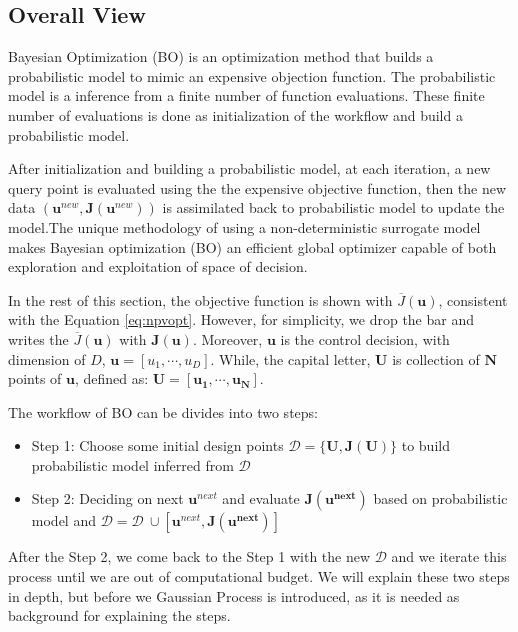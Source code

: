 \documentclass[]{elsarticle} %
\providecommand{\tightlist}{%
  \setlength{\itemsep}{0pt}\setlength{\parskip}{0pt}}
\begin{document}
\hypertarget{overall-view}{%
\subsection{Overall View}\label{overall-view}}

Bayesian Optimization (BO) is an optimization method that builds a probabilistic model to mimic an expensive objection function. The probabilistic model is a inference from a finite number of function evaluations. These finite number of evaluations is done as initialization of the workflow and build a probabilistic model.

After initialization and building a probabilistic model, at each iteration, a new query point is evaluated using the the expensive objective function, then the new data \((\mathbf{u}^{new},\mathbf{J}(\mathbf{u}^{new}))\) is assimilated back to probabilistic model to update the model.The unique methodology of using a non-deterministic surrogate model makes Bayesian optimization (BO) an efficient global optimizer capable of both exploration and exploitation of space of decision.

In the rest of this section, the objective function is shown with \(\overline{J}(\mathbf{u})\), consistent with the Equation \eqref{eq:npvopt}. However, for simplicity, we drop the bar and writes the \(\overline{J}(\mathbf{u})\) with \(\mathbf{J}(\mathbf{u})\). Moreover, \(\mathbf{u}\) is the control decision, with dimension of \(D\), \(\mathbf{u}=[u_1,\cdots,u_D]\). While, the capital letter, \(\mathbf{U}\) is collection of \(\mathbf{N}\) points of \(\mathbf{u}\), defined as: \(\mathbf{U}= [\mathbf{u_1},\cdots,\mathbf{u_N}]\).

The workflow of BO can be divides into two steps:

\begin{itemize}
\tightlist
\item
  Step 1: Choose some initial design points \(\mathcal{D}=\{{\mathbf{U},\mathbf{J(U)}}\}\) to build probabilistic model inferred from \(\mathcal{D}\)
\item
  Step 2: Deciding on next \(\mathbf{u}^{next}\) and evaluate \(\mathbf{J(u^{next})}\) based on probabilistic model and \(\mathcal{D}=\mathcal{D}\: \cup[\mathbf{u}^{next},\mathbf{J(u^{next})}]\)
\end{itemize}

After the Step 2, we come back to the Step 1 with the new \(\mathcal{D}\) and we iterate this process until we are out of computational budget. We will explain these two steps in depth, but before we Gaussian Process is introduced, as it is needed as background for explaining the steps.
\end{document}
